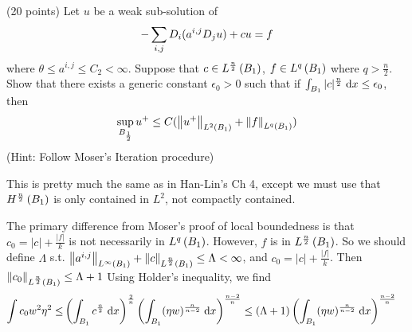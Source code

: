 (20 points)
Let $u$ be a weak sub-solution of
\begin{align*}
  -\sum_{i, j} D_{i} (a^{i, j} D_{j} u) + c u = f
\end{align*}
where $\theta \leq a^{i, j} \leq C_2 < \infty$.
Suppose that $c \in L^{\frac{n}{2}}\left(B_1 \right)$, $f \in L^{q}\left(B_1 \right)$
where $q > \frac{n}{2}$.
Show that there exists a generic constant $\epsilon_0 > 0$ such that if
$\int_{B_1} |c|^{\frac{n}{2}} \;\mathrm{d}x \leq \epsilon_0$, then
\begin{align*}
  \sup_{B_{\frac{1}{2}}} u^+ \leq C ( \left\lVert u^+\right\rVert_{L^{2}(B_1)} + \left\lVert f\right\rVert_{L^{q}(B_1)} )
\end{align*}
(Hint: Follow Moser's Iteration procedure)

This is pretty much the same as in Han-Lin's Ch 4,
except we must use that $H^{\frac{n}{2}}\left(B_1 \right)$
is only contained in $L^2$, not compactly contained.

The primary difference from Moser's proof of local boundedness is that
$c_0 = \lvert c \rvert + \frac{\lvert f \rvert}{k}$
is not necessarily in $L^{q}\left(B_1 \right)$.
However, $f$ is in $L^{\frac{n}{2}}\left(B_1 \right)$.
So we should define $\Lambda$ s.t.
$\left\lVert a^{i, j}\right\rVert_{L^{\infty}(B_1)} + \left\lVert c\right\rVert_{L^{\frac{n}{2}}(B_1)} \leq \Lambda < \infty$,
and $c_0 = \lvert c \rvert + \frac{\lvert f \rvert}{k}$.
Then $\left\lVert c_0\right\rVert_{L^{\frac{n}{2}}(B_1)} \leq \Lambda + 1$
Using Holder's inequality, we find
\begin{align*}
  \int c_0 w^2 \eta^2 \leq
    & \left( \int_{B_1} c^{\frac{n}{2}} \;\mathrm{d}x \right)^{\frac{2}{n}}
      \left( \int_{B_1} (\eta w)^{\frac{n}{n - 2}} \;\mathrm{d}x \right)^{\frac{n - 2}{n}}
      \leq (\Lambda + 1) \left( \int_{B_1} (\eta w)^{\frac{n}{n - 2}} \;\mathrm{d}x \right)^{\frac{n - 2}{n}}
\end{align*}



